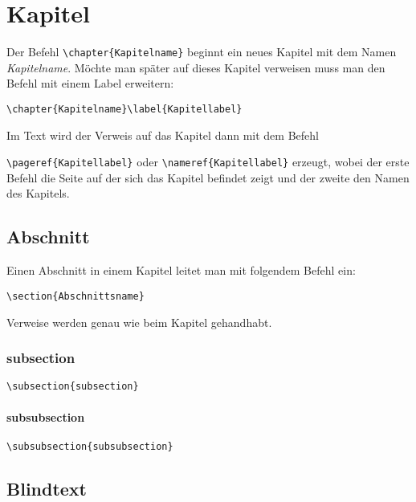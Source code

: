 \cleardoublepage
\chapter{Kapitel}\label{ch:Kapitel}
Der Befehl \verb+\chapter{Kapitelname}+ beginnt ein neues Kapitel mit dem Namen \textit{Kapitelname}. Möchte man später auf dieses Kapitel verweisen muss man den Befehl mit einem Label erweitern: \smallskip
 
\verb+\chapter{Kapitelname}\label{Kapitellabel}+\smallskip

 Im Text wird der Verweis auf das Kapitel dann mit dem Befehl\smallskip
 
  \verb+\pageref{Kapitellabel}+ oder \verb+\nameref{Kapitellabel}+ erzeugt, wobei der erste Befehl die Seite auf der sich das Kapitel befindet zeigt und der zweite den Namen des Kapitels.
\bigskip

\section{Abschnitt}\label{Abschnitt}

Einen Abschnitt in einem Kapitel leitet man mit folgendem Befehl ein:\smallskip

\verb+\section{Abschnittsname}+ \smallskip

Verweise werden genau wie beim Kapitel gehandhabt.

\subsection{subsection}

\verb+\subsection{subsection}+

\subsubsection{subsubsection}


\verb+\subsubsection{subsubsection}+

\section{Blindtext}
\Blindtext

